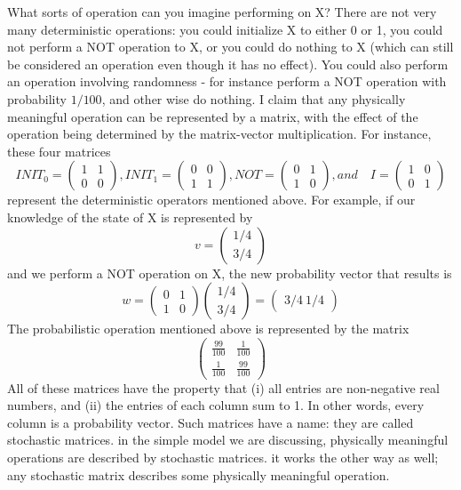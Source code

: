 \documentclass[12pt, oneside]{book}
\theoremstyle{definition}
\theoremstyle{definition}
\theoremstyle{remark}
\begin{document}
What sorts of operation can you imagine performing on X? There are not very many deterministic operations: you could initialize X to either 0 or 1, you could not perform a NOT operation to X, or you could do nothing to X (which can still be considered an operation even though it has no effect). You could also perform an operation involving randomness - for instance perform a NOT operation with probability $1/100$, and other wise do nothing. I claim that any physically meaningful operation can be represented by a matrix, with the effect of the operation being determined by the matrix-vector multiplication. For instance, these four matrices
\[
INIT_0 = \begin{pmatrix} 1 & 1 \\ 0 & 0\end{pmatrix}, INIT_1= \begin{pmatrix} 0 & 0 \\ 1 & 1 \end{pmatrix}, 
NOT = \begin{pmatrix} 0 & 1 \\ 1 & 0\end{pmatrix}, and \quad I = \begin{pmatrix} 1 & 0 \\ 0 & 1\end{pmatrix}
\]
represent the deterministic operators mentioned above. For example, if our knowledge of the state of X is represented by
\[
v=\begin{pmatrix}1/4 \\ 3/4 \end{pmatrix}
\]
and we perform a NOT operation on X, the new probability vector that results is
\[
w=\begin{pmatrix} 0 & 1 \\ 1 & 0 \end{pmatrix}\begin{pmatrix} 1/4 \\3/4 \end{pmatrix} =\begin{pmatrix}3/4 \ 1/4 \end{pmatrix}
\]
The probabilistic operation mentioned above is represented by the matrix
\[
\begin{pmatrix} \frac{99}{100} & \frac{1}{100} \\ \frac{1}{100} & \frac{99}{100} \end{pmatrix}
\]
All of these matrices have the property that (i) all entries are non-negative real numbers, and (ii) the entries of each column sum to 1. In other words, every column is a probability vector. Such matrices have a name: they are called stochastic matrices. in the simple model we are discussing, physically meaningful operations are described by stochastic matrices. it works the other way as well; any stochastic matrix describes some physically meaningful operation.
\end{document}
